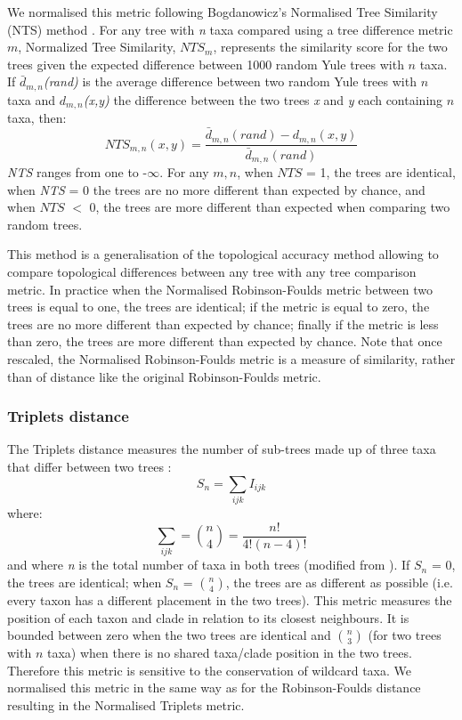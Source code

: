 We normalised this metric following Bogdanowicz's Normalised Tree Similarity (NTS) method \citep{Bogdanowicz2012}.
For any tree with \textit{n} taxa compared using a tree difference metric $m$, Normalized Tree Similarity, $NTS_m$, represents the similarity score for the two trees given the expected difference between 1000 random Yule trees \citep{Bogdanowicz2012} with $n$ taxa. If $\bar{d}_{m,n}$\textit{(rand)} is the average difference between two random Yule trees with $n$ taxa and $d_{m,n}$\textit{(x,y)} the difference between the two trees \textit{x} and \textit{y} each containing $n$ taxa, then:
\begin{equation}
NTS_{m,n}(x,y)=\frac{\bar{d}_{m,n}(rand) - d_{m,n}(x,y)} {\bar{d}_{m,n}(rand)}
\end{equation}
\textit{NTS} ranges from one to -$\infty$.
For any $m,n$, when $NTS$ = 1, the trees are identical, when \textit{NTS} = 0 the trees are no more different than expected by chance, and when $NTS$ $<$ 0, the trees are more different than expected when comparing two random trees. 

This method is a generalisation of the topological accuracy method \citep{Price2010} allowing to compare topological differences between any tree with any tree comparison metric.
In practice when the Normalised Robinson-Foulds metric between two trees is equal to one, the trees are identical; if the metric is equal to zero, the trees are no more different than expected by chance; finally if the metric is less than zero, the trees are more different than expected by chance.
Note that once rescaled, the Normalised Robinson-Foulds metric is a measure of similarity, rather than of distance like the original Robinson-Foulds metric. 

\subsubsection*{Triplets distance}
The Triplets distance \citep{dobson1975triplets} measures the number of sub-trees made up of three taxa that differ between two trees \citep{critchlowthe1996}:
\begin{equation}
S_n = \sum_{ijk} I_{ijk}
\end{equation}
where:
\begin{equation}
\sum_{ijk} = \binom{n}{4} = \frac{n!}{4!(n-4)!}
\end{equation}
and where \textit{n} is the total number of taxa in both trees (modified from \cite{critchlowthe1996}).
If $S_n$ = 0, the trees are identical; when $S_n$ = $\binom{n}{4}$, the trees are as different as possible (i.e. every taxon has a different placement in the two trees).
This metric measures the position of each taxon and clade in relation to its closest neighbours.
It is bounded between zero when the two trees are identical and $\binom{n}{3}$ (for two trees with $n$ taxa) when there is no shared taxa/clade position in the two trees.
Therefore this metric is sensitive to the conservation of wildcard taxa.
We normalised this metric in the same way as for the Robinson-Foulds distance resulting in the Normalised Triplets metric.

